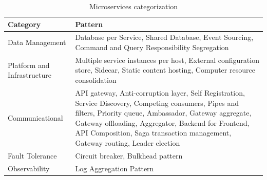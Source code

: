 \documentclass[conference]{IEEEtran}
\begin{document}
\begin{center}
    \begin{table}
    \renewcommand*{\arraystretch}{1.8}
    \begin{tabular}{ | m{3cm} | m{12cm} | }

        \hline

        Category & Pattern
 
        \\

        \hline

        Data Management &  Database per Service, Shared Database, Event Sourcing, Command and Query Responsibility Segregation
 
        \\

        \hline

        Platform and Infrastructure & Multiple service instances per host, External configuration store, Sidecar, Static content hosting, Computer resource consolidation
 
        \\

        \hline

        Communicational & API gateway,  Anti-corruption layer, Self Registration, Service Discovery, Competing consumers, Pipes and filters, Priority queue, Ambassador, Gateway aggregate, Gateway offloading, Aggregator, Backend for Frontend, API Composition, Saga transaction management, Gateway routing, Leader election
        
 
        \\

        \hline

        Fault Tolerance & Circuit breaker, Bulkhead pattern
 
        \\
        \hline

        Observability & Log Aggregation Pattern
 
        \\
        \hline


    \end{tabular}
    \caption{Microservices categorization}
    \label{microservices-categorization}
    \end{table}
\end{center}


\end{document}
